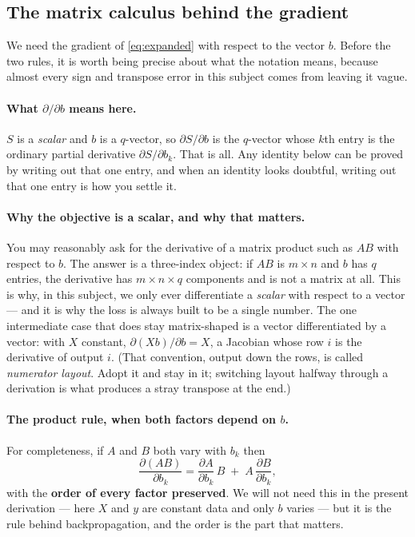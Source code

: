 \documentclass[11pt]{article}
\begin{document}
\subsection{The matrix calculus behind the gradient}
\label{sec:matcalc}

We need the gradient of \eqref{eq:expanded} with respect to the vector $b$.
Before the two rules, it is worth being precise about what the notation means,
because almost every sign and transpose error in this subject comes from
leaving it vague.

\paragraph{What $\partial/\partial b$ means here.} $S$ is a \emph{scalar} and
$b$ is a $q$-vector, so $\partial S/\partial b$ is the $q$-vector whose $k$th
entry is the ordinary partial derivative $\partial S/\partial b_k$. That is
all. Any identity below can be proved by writing out that one entry, and when
an identity looks doubtful, writing out that one entry is how you settle it.

\paragraph{Why the objective is a scalar, and why that matters.} You may
reasonably ask for the derivative of a matrix product such as $AB$ with
respect to $b$. The answer is a three-index object: if $AB$ is $m \times n$
and $b$ has $q$ entries, the derivative has $m \times n \times q$ components
and is not a matrix at all. This is why, in this subject, we only ever
differentiate a \emph{scalar} with respect to a vector --- and it is why the
loss is always built to be a single number. The one intermediate case that
does stay matrix-shaped is a vector differentiated by a vector: with $X$
constant, $\partial(Xb)/\partial b = X$, a Jacobian whose row $i$ is the
derivative of output $i$. (That convention, output down the rows, is called
\emph{numerator layout}. Adopt it and stay in it; switching layout halfway
through a derivation is what produces a stray transpose at the end.)

\paragraph{The product rule, when both factors depend on $b$.} For
completeness, if $A$ and $B$ both vary with $b_k$ then
\[
  \frac{\partial (AB)}{\partial b_k}
  = \frac{\partial A}{\partial b_k}\,B \;+\; A\,\frac{\partial B}{\partial b_k},
\]
with the \textbf{order of every factor preserved}. We will not need this in
the present derivation --- here $X$ and $y$ are constant data and only $b$
varies --- but it is the rule behind backpropagation, and the order is the
part that matters.
\end{document}
